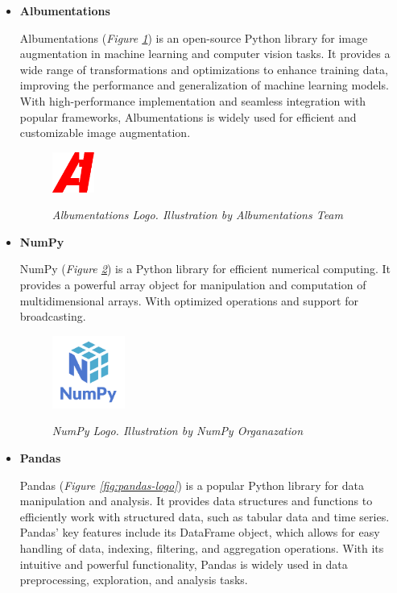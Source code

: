 \begin{itemize}
  \item \textbf{Albumentations}

    Albumentations (\textit{Figure \ref{fig:albumentations-logo}}) is an
    open-source Python library for image augmentation in machine learning and
    computer vision tasks. It provides a wide range of transformations and
    optimizations to enhance training data, improving the performance and
    generalization of machine learning models. With high-performance
    implementation and seamless integration with popular frameworks,
    Albumentations is widely used for efficient and customizable image
    augmentation.

    \begin{figure}[H] \centering
      \includegraphics[width=0.13\textwidth]{imatges/studies_and_decisions/albumentations-logo.png}
      \caption[Albumentations Logo]{\textit{Albumentations Logo. Illustration
      by Albumentations Team}} {\label{fig:albumentations-logo}} \end{figure}

    \item \textbf{NumPy}

    NumPy (\textit{Figure \ref{fig:numpy-logo}}) is a Python library for
    efficient numerical computing. It provides a powerful array object for
    manipulation and computation of multidimensional arrays. With optimized
    operations and support for broadcasting.

    \begin{figure}[H]
      \centering
      \includegraphics[width=0.225\textwidth]{imatges/studies_and_decisions/numpy-logo.png}
      \caption[NumPy Logo]{\textit{NumPy Logo. Illustration by NumPy Organazation}}
      {\label{fig:numpy-logo}}
    \end{figure}

  \item \textbf{Pandas}

    Pandas (\textit{Figure \ref{fig:pandas-logo}}) is a popular Python library
    for data manipulation and analysis. It provides data structures and
    functions to efficiently work with structured data, such as tabular data
    and time series. Pandas' key features include its DataFrame object, which
    allows for easy handling of data, indexing, filtering, and aggregation
    operations. With its intuitive and powerful functionality, Pandas is widely
    used in data preprocessing, exploration, and analysis tasks.


\end{itemize}
